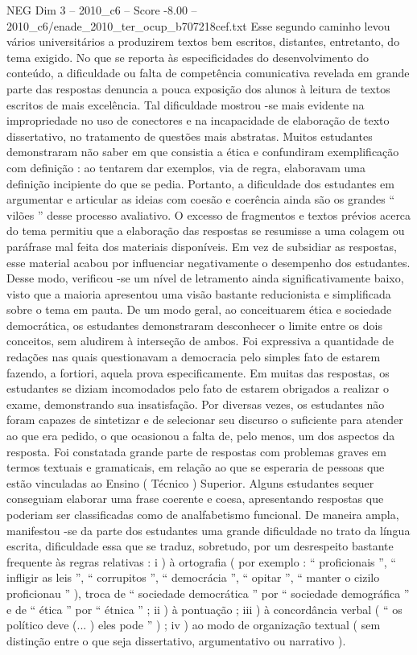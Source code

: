 \begin{textsample}{NEG Dim 3 – 2010\_c6 – Score -8.00 – 2010\_c6/enade\_2010\_ter\_ocup\_b707218cef.txt}
Esse segundo caminho levou vários universitários a produzirem textos bem escritos, distantes, entretanto, do tema exigido.
No que se reporta às especificidades do desenvolvimento do conteúdo, a dificuldade ou falta de competência comunicativa revelada em grande parte das respostas denuncia a pouca exposição dos alunos à leitura de textos escritos de mais excelência.
Tal dificuldade mostrou -se mais evidente na impropriedade no uso de conectores e na incapacidade de elaboração de texto dissertativo, no tratamento de questões mais abstratas.
Muitos estudantes demonstraram não saber em que consistia a ética e confundiram exemplificação com definição : ao tentarem dar exemplos, via de regra, elaboravam uma definição incipiente do que se pedia.
Portanto, a dificuldade dos estudantes em argumentar e articular as ideias com coesão e coerência ainda são os grandes “ vilões ” desse processo avaliativo.
O excesso de fragmentos e textos prévios acerca do tema permitiu que a elaboração das respostas se resumisse a uma colagem ou paráfrase mal feita dos materiais disponíveis.
Em vez de subsidiar as respostas, esse material acabou por influenciar negativamente o desempenho dos estudantes.
Desse modo, verificou -se um nível de letramento ainda significativamente baixo, visto que a maioria apresentou uma visão bastante reducionista e simplificada sobre o tema em pauta.
De um modo geral, ao conceituarem ética e sociedade democrática, os estudantes demonstraram desconhecer o limite entre os dois conceitos, sem aludirem à interseção de ambos.
Foi expressiva a quantidade de redações nas quais questionavam a democracia pelo simples fato de estarem fazendo, a fortiori, aquela prova especificamente.
Em muitas das respostas, os estudantes se diziam incomodados pelo fato de estarem obrigados a realizar o exame, demonstrando sua insatisfação.
Por diversas vezes, os estudantes não foram capazes de sintetizar e de selecionar seu discurso o suficiente para atender ao que era pedido, o que ocasionou a falta de, pelo menos, um dos aspectos da resposta.
Foi constatada grande parte de respostas com problemas graves em termos textuais e gramaticais, em relação ao que se esperaria de pessoas que estão vinculadas ao Ensino ( Técnico ) Superior.
Alguns estudantes sequer conseguiam elaborar uma frase coerente e coesa, apresentando respostas que poderiam ser classificadas como de analfabetismo funcional.
De maneira ampla, manifestou -se da parte dos estudantes uma grande dificuldade no trato da língua escrita, dificuldade essa que se traduz, sobretudo, por um desrespeito bastante frequente às regras relativas : i ) à ortografia ( por exemplo : “ proficionais ”, “ infligir as leis ”, “ corrupitos ”, “ democrácia ”, “ opitar ”, “ manter o cizilo proficionau ” ), troca de “ sociedade democrática ” por “ sociedade demográfica ” e de “ ética ” por “ étnica ” ; ii ) à pontuação ; iii ) à concordância verbal ( “ os político deve (... ) eles pode ” ) ; iv ) ao modo de organização textual ( sem distinção entre o que seja dissertativo, argumentativo ou narrativo ).

\end{textsample}
